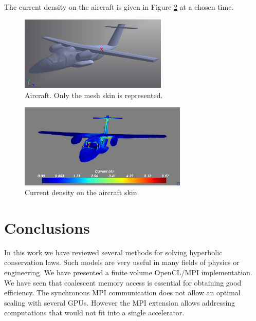 \documentclass[12pt]{amsart}
\begin{document}
The current density on the aircraft is given in Figure \ref{fig:current} at a chosen time.

\begin{figure}[h]
\begin{center}
\includegraphics[width=7cm]{ntc1-unstructured}
\par\end{center}
\caption{Aircraft. Only the mesh skin is represented.\label{fig:ntc1}}
\end{figure}



\begin{figure}[h]
\begin{center}
\includegraphics[width=8cm]{current}
\par\end{center}
\caption{Current density on the aircraft skin.\label{fig:current}}
\end{figure}





\section{Conclusions}
In this work we have reviewed several methods for solving hyperbolic conservation laws. Such models are very useful in many fields of physics or engineering.
We have presented a finite volume OpenCL/MPI implementation. We have seen that coalescent memory access is essential for obtaining good efficiency. The synchronous MPI communication does not allow an optimal scaling with several GPUs. However the MPI extension allows addressing computations that would not fit into a single accelerator.
\end{document}

